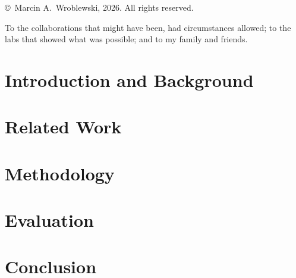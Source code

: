 \documentclass[11pt]{extbook}
\begin{document}
   \frontmatter

   \pagestyle{prelim}
   

   
   \newpage

	 \thispagestyle{empty}
	 \begin{titlepage}
	 \vspace*{50em}
	 \begin{center}
		 \copyright \ Marcin A.\ Wroblewski, 2026.  All rights reserved.
	 \end{center}
	 \end{titlepage}
	 \newpage
	
	 \thispagestyle{plain}
	 \vspace*{20em}
	 \begin{center}
	   To the collaborations that might have been, had circumstances allowed; to the labs that showed what was possible; and to my family and friends.
	 \end{center}
	 \newpage


  \doublespacing
   
   \tableofcontents
   \newpage
   \listoffigures
   \newpage
   \listoftables
   \newpage
   
   
   \newpage

   
   
   \mainmatter
   
   \pagestyle{maintext}

   \chapter{Introduction and Background}
   

   \chapter[Related Work]{Related Work}
   \label{ch:related}
   

   \chapter[Methodology]{Methodology}
   \label{ch:imprecision-chapter}
   

   \chapter[Evaluation]{Evaluation}
   \label{ch:lifelong}

   \chapter[Conclusion]{Conclusion}
    \label{ch:conclusion}


       

\backmatter


\end{document}
